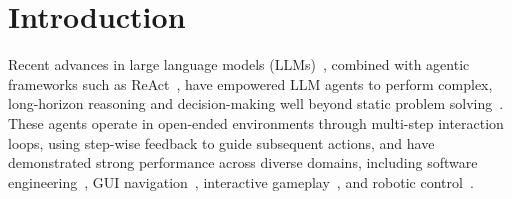 \documentclass{article}
\newcommand{\needrev}[1]{{\color{darkgreen}#1}} %
\newcommand{\needrev}[1]{#1} %
\newcommand{\name}{Hera\xspace}
\begin{document}
\begin{abstract}
The first stage casts step-level routing as a supervised classification problem: the device agent is replayed on cloud trajectories, with each state labeled by the agreement between device and cloud actions.
In the second stage, we perform cost-aware reinforcement learning by grouping identical states across trajectories and updating \name with labels favoring higher expected return and fewer future cloud calls.
We evaluate \name on ALFWorld, WebShop, and AppWorld, where it consistently outperforms prior methods,
achieving 92.5\% of the cloud-only success rate with cloud use in only 46.3\% of steps.
\end{abstract}



\section{Introduction}
Recent advances in large language models (LLMs)~\citep{singh2025openai,yang2025qwen3,liu2024deepseek}, combined with agentic frameworks such as ReAct~\citep{Yao2023ReAct}, have empowered LLM agents to perform complex, long-horizon reasoning and decision-making well beyond static problem solving~\citep{chang2024agentboard}.
These agents operate in open-ended environments through multi-step interaction loops, using step-wise feedback to guide subsequent actions, and have demonstrated strong performance across diverse domains, including software engineering~\citep{zhang2024codeagent,yang2025kimi}, GUI navigation~\citep{vattikondatrain,gurreal}, interactive gameplay~\citep{wangvoyager,tan2025lumine}, and robotic control~\citep{zitkovich2023rt,hanrobocerebra}.
\end{document}
